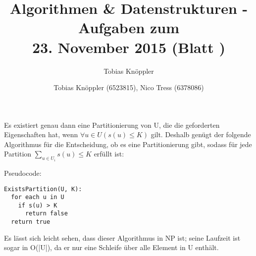 \documentclass[fleqn]{article}
\date{\gertoday}
\title{Algorithmen \& Datenstrukturen - Aufgaben zum \\23. November 2015 (Blatt \leadingzero{\pagenum})}
\author{Tobias Knöppler}
\author{Tobias Knöppler (6523815), Nico Tress (6378086)}
\date{\gertoday}
\begin{document}
\maketitle
\section{}%
\subsection{}%

Es existiert genau dann eine Partitionierung von U, die die geforderten Eigenschaften hat, wenn $\forall u \in U (s(u) \leq K)$ gilt. Deshalb genügt der folgende Algorithmus für die Entscheidung, ob es eine Partitionierung gibt, sodass für jede Partition $\sum\limits_{u \in U_i} s(u) \leq K$ erfüllt ist:

Pseudocode:
\begin{lstlisting}
ExistsPartition(U, K):
  for each u in U
    if s(u) > K
      return false
  return true
\end{lstlisting}

Es lässt sich leicht sehen, dass dieser Algorithmus in NP ist; seine Laufzeit ist sogar in O(|U|), da er nur eine Schleife über alle Element in U enthält.
\end{document}
